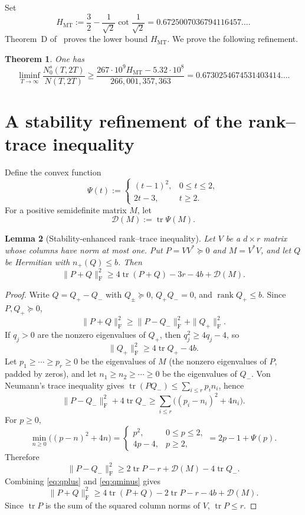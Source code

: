 \documentclass[11pt]{article}
\newtheorem{theorem}{Theorem}[section]
\newtheorem{lemma}[theorem]{Lemma}
\DeclareMathOperator{\tr}{tr}
\newcommand{\F}{\mathrm F}
\newcommand{\cD}{\mathcal D}
\begin{document}
Set
\[
 H_{\mathrm{MT}}
 :=\frac32-\frac1{\sqrt2}\cot\frac1{\sqrt2}
 =0.6725007036794116457\ldots .
\]
Theorem~D of~\cite{Claude26} proves the lower bound $H_{\mathrm{MT}}$.
We prove the following refinement.

\begin{theorem}\label{thm:main}
One has
\[
 \liminf_{T\to\infty}
 \frac{N_0^s(T,2T)}{N(T,2T)}
 \ge
 \frac{267\cdot10^{9}H_{\mathrm{MT}}-5.32\cdot10^{8}}{266{,}001{,}357{,}363}
 =0.6730254674531403414\ldots .
\]
\end{theorem}

\section{A stability refinement of the rank--trace inequality}

Define the convex function
\begin{equation}\label{eq:Psi}
 \Psi(t):=
 \begin{cases}
  (t-1)^2,&0\le t\le2,\\
  2t-3,&t\ge2.
 \end{cases}
\end{equation}
For a positive semidefinite matrix $M$, let
\[
 \cD(M):=\tr\Psi(M).
\]

\begin{lemma}[Stability-enhanced rank--trace inequality]\label{lem:stable-rank-trace}
Let $V$ be a $d\times r$ matrix whose columns have norm at most one.  Put
$P=VV^*\succeq0$ and $M=V^*V$, and let $Q$ be Hermitian with $n_+(Q)\le b$.
Then
\begin{equation}\label{eq:stable-rank-trace}
 \|P+Q\|_{\F}^2
 \ge 4\tr(P+Q)-3r-4b+\cD(M).
\end{equation}
\end{lemma}

\begin{proof}
Write $Q=Q_+-Q_-$ with $Q_\pm\succeq0$, $Q_+Q_-=0$, and
$\operatorname{rank}Q_+\le b$.  Since $P,Q_+\succeq0$,
\[
 \|P+Q\|_{\F}^2
 \ge \|P-Q_-\|_{\F}^2+\|Q_+\|_{\F}^2.
\]
If $q_j>0$ are the nonzero eigenvalues of $Q_+$, then
$q_j^2\ge4q_j-4$, so
\begin{equation}\label{eq:qplus}
 \|Q_+\|_{\F}^2\ge4\tr Q_+-4b.
\end{equation}
Let $p_1\ge\cdots\ge p_r\ge0$ be the eigenvalues of $M$ (the nonzero
eigenvalues of $P$, padded by zeros), and let $n_1\ge n_2\ge\cdots\ge0$
be the eigenvalues of $Q_-$.  Von Neumann's trace inequality gives
$\tr(PQ_-)\le\sum_{i\le r}p_in_i$, hence
\[
 \|P-Q_-\|_{\F}^2+4\tr Q_-
 \ge \sum_{i\le r}\bigl((p_i-n_i)^2+4n_i\bigr).
\]
For $p\ge0$,
\[
 \min_{n\ge0}\bigl((p-n)^2+4n\bigr)
 =\begin{cases}p^2,&0\le p\le2,\\4p-4,&p\ge2,\end{cases}
 =2p-1+\Psi(p).
\]
Therefore
\begin{equation}\label{eq:qminus}
 \|P-Q_-\|_{\F}^2
 \ge2\tr P-r+\cD(M)-4\tr Q_-.
\end{equation}
Combining \eqref{eq:qplus} and \eqref{eq:qminus} gives
\[
 \|P+Q\|_{\F}^2
 \ge4\tr(P+Q)-2\tr P-r-4b+\cD(M).
\]
Since $\tr P$ is the sum of the squared column norms of $V$, $\tr P\le r$.
\end{proof}
\end{document}

